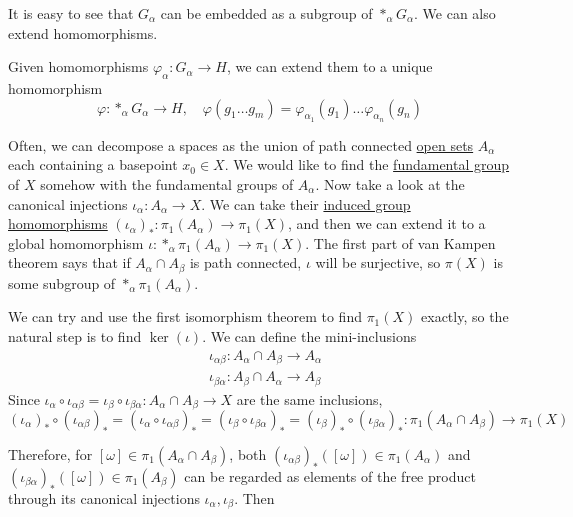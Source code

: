 	It is easy to see that $G_\alpha$ can be embedded as a subgroup of $\ast_\alpha G_\alpha$. We can also extend homomorphisms. 

	\begin{theorem}
	  \label{thm:extension-of-homomorphisms-onto-free-product}
	  Given homomorphisms $\varphi_\alpha: G_\alpha \to H$, we can extend them to a unique homomorphism 
		\begin{equation}
			\varphi: \ast_\alpha G_\alpha \to H, \quad \varphi(g_1 \ldots g_m) = \varphi_{\alpha_1}(g_1) \ldots \varphi_{\alpha_n}(g_n)
		\end{equation}
	\end{theorem}

	Often, we can decompose a spaces as the union of path connected \hyperref[pst-def:open-set]{open sets} $A_\alpha$ each containing a basepoint $x_0 \in X$. We would like to find the \hyperref[def:fundamental-group]{fundamental group} of $X$ somehow with the fundamental groups of $A_\alpha$. Now take a look at the canonical injections $\iota_\alpha : A_\alpha \to X$. We can take their \hyperref[def:induced-group-homomorphism]{induced group homomorphisms} $(\iota_\alpha)_\ast : \pi_1 (A_\alpha) \to \pi_1 (X)$, and then we can extend it to a global homomorphism $\iota: \ast_\alpha \pi_1(A_\alpha) \to \pi_1 (X)$. The first part of van Kampen theorem says that if $A_\alpha \cap A_\beta$ is path connected, $\iota$ will be surjective, so $\pi(X)$ is some subgroup of $\ast_\alpha \pi_1(A_\alpha)$. 

	We can try and use the first isomorphism theorem to find $\pi_1 (X)$ exactly, so the natural step is to find $\ker(\iota)$. We can define the mini-inclusions 
	\begin{align}
		& \iota_{\alpha \beta} :A_\alpha \cap A_\beta \to A_\alpha \\
		& \iota_{\beta \alpha} :A_\beta \cap A_\alpha \to A_\beta
	\end{align}
	Since $\iota_\alpha \circ \iota_{\alpha\beta} = \iota_\beta \circ \iota_{\beta\alpha}: A_\alpha \cap A_\beta \to X$ are the same inclusions, 
	\begin{equation}
		(\iota_\alpha)_\ast \circ (\iota_{\alpha\beta})_\ast = (\iota_\alpha \circ \iota_{\alpha\beta})_\ast = (\iota_\beta \circ \iota_{\beta\alpha})_\ast = (\iota_\beta)_\ast \circ (\iota_{\beta\alpha})_\ast: \pi_1 (A_\alpha \cap A_\beta) \to \pi_1 (X)
	\end{equation} 

	Therefore, for $[\omega] \in \pi_1 (A_\alpha \cap A_\beta)$, both $(\iota_{\alpha \beta})_\ast ([\omega]) \in \pi_1 (A_\alpha)$ and $(\iota_{\beta\alpha})_\ast ([\omega]) \in \pi_1 (A_\beta)$ can be regarded as elements of the free product through its canonical injections $\iota_\alpha, \iota_\beta$. Then 


